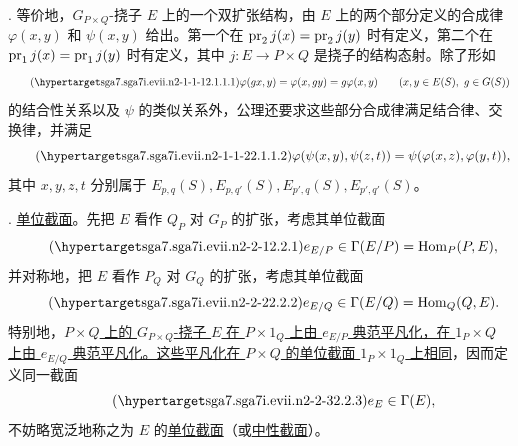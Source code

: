
. 等价地，$G_{P\times Q}$-挠子 $E$ 上的一个双扩张结构，由 $E$ 上的两个部分定义的合成律 $\varphi(x,y)$ 和 $\psi(x,y)$ 给出。第一个在 $\operatorname{pr}_2j(x)=\operatorname{pr}_2j(y)$ 时有定义，第二个在 $\operatorname{pr}_1j(x)=\operatorname{pr}_1j(y)$ 时有定义，其中 $j:E\longrightarrow P\times Q$ 是挠子的结构态射。除了形如
\begin{equation}\tag{\SGARefTarget{sga7.sga7i.evii.n2-1-1-1}{2.1.1.1}}
 \varphi(gx,y)=\varphi(x,gy)=g\varphi(x,y)
 \qquad(x,y\in E(S),\ g\in G(S))
\end{equation}
的结合性关系以及 $\psi$ 的类似关系外，公理还要求这些部分合成律满足结合律、交换律，并满足
\begin{equation}\tag{\SGARefTarget{sga7.sga7i.evii.n2-1-1-2}{2.1.1.2}}
 \varphi(\psi(x,y),\psi(z,t))
 =\psi(\varphi(x,z),\varphi(y,t)),
\end{equation}
其中 $x,y,z,t$ 分别属于 $E_{p,q}(S),E_{p,q'}(S),E_{p',q}(S),E_{p',q'}(S)$。




. \underline{单位截面}。先把 $E$ 看作 $Q_P$ 对 $G_P$ 的扩张，考虑其单位截面
\begin{equation}\tag{\SGARefTarget{sga7.sga7i.evii.n2-2-1}{2.2.1}}
 e_{E/P}\in\Gamma(E/P)=\operatorname{Hom}_P(P,E),
\end{equation}
并对称地，把 $E$ 看作 $P_Q$ 对 $G_Q$ 的扩张，考虑其单位截面
\begin{equation}\tag{\SGARefTarget{sga7.sga7i.evii.n2-2-2}{2.2.2}}
 e_{E/Q}\in\Gamma(E/Q)=\operatorname{Hom}_Q(Q,E).
\end{equation}
特别地，\underline{$P\times Q$ 上的 $G_{P\times Q}$-挠子 $E$ 在 $P\times1_Q$ 上由 $e_{E/P}$ 典范平凡化，在 $1_P\times Q$ 上由 $e_{E/Q}$ 典范平凡化。这些平凡化在 $P\times Q$ 的单位截面 $1_P\times1_Q$ 上相同}，因而定义同一截面
\begin{equation}\tag{\SGARefTarget{sga7.sga7i.evii.n2-2-3}{2.2.3}}
 e_E\in\Gamma(E),
\end{equation}
不妨略宽泛地称之为 $E$ 的\underline{单位截面}（或\underline{中性截面}）。

